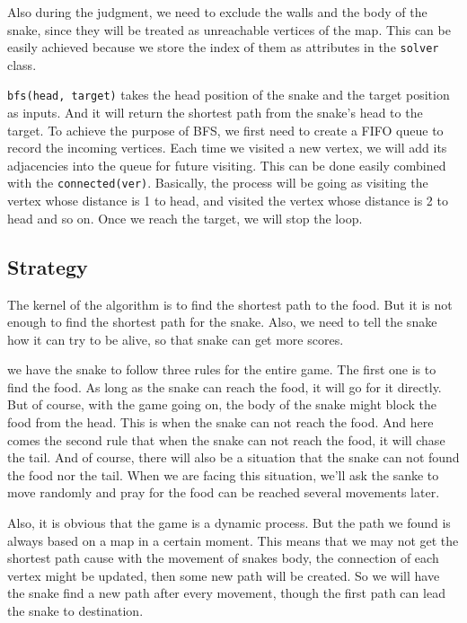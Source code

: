\documentclass[12pt]{article}
\begin{document}
Also during the judgment, we need to exclude the walls and the body of the snake, since they 
will be treated as unreachable vertices of the map. This can be easily achieved because we 
store the index of them as attributes in the \verb|solver| class.

\verb|bfs(head, target)| takes the head position of the snake and the target position as 
inputs. And it will return the shortest path from the snake's head to the target. 
To achieve the purpose of BFS, we first need to create a FIFO queue to record the incoming 
vertices. Each time we visited a new vertex, we will add its adjacencies into the queue for 
future visiting. This can be done easily combined with the \verb|connected(ver)|. 
Basically, the process will be going as visiting the vertex whose distance is 1 to head, 
and visited the vertex whose distance is 2 to head and so on. Once we reach the target, 
we will stop the loop.

\subsection{Strategy}

The kernel of the algorithm is to find the shortest path to the food. But it is not enough to
find the shortest path for the snake. Also, we need to tell the snake how it can try to be 
alive, so that snake can get more scores. 

we have the snake to follow three rules for the entire game. The first one is to find the food. 
As long as the snake can reach the food, it will go for it directly. But of course, with the 
game going on, the body of the snake might block the food from the head. This is when the snake
can not reach the food. And here comes the second rule that when the snake can not reach the 
food, it will chase the tail. And of course, there will also be a situation that the snake can
not found the food nor the tail. When we are facing this situation, we'll ask the sanke to move 
randomly and pray for the food can be reached several movements later.

Also, it is obvious that the game is a dynamic process. But the path we found is always based on a map in a certain moment. This means that we may not get the shortest path cause with the movement of snakes body, the connection of each vertex might be updated, then some new path will be created. So we will have the snake find a new path after every movement, though the first path can lead the snake to destination.
\end{document}
